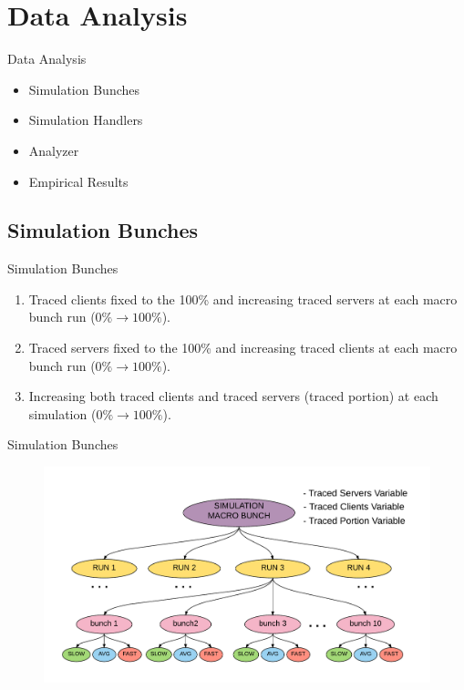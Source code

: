 \section{Data Analysis}

\begin{frame}{Data Analysis}{}
	\begin{itemize}
		\item {Simulation Bunches}
		\item {Simulation Handlers}
		\item {Analyzer}
		\item {Empirical Results}
	\end{itemize}
		

\end{frame}

\subsection{Simulation Bunches}	
	\begin{frame}{Simulation Bunches}
		
		\begin{enumerate}
			\item Traced clients fixed to the 100\% and increasing
traced servers at each macro bunch run ($ 0\% \rightarrow 100\% $).
			\item Traced servers fixed to the 100\% and increasing
traced clients at each macro bunch run ($ 0\% \rightarrow 100\% $).
			\item Increasing both traced clients and traced servers (traced
		 portion) at each simulation ($ 0\% \rightarrow 100\% $).
		\end{enumerate}

	\end{frame}
	\begin{frame}{Simulation Bunches}
		\begin{figure}
			\centering
			\includegraphics[scale=0.45]{img/bunches.pdf}
		\end{figure}
	\end{frame}	

